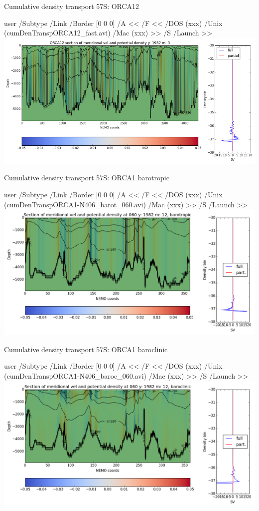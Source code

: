 \documentclass{beamer}
\newcommand{\LaunchBinary}[2]{%
  \leavevmode%
  \pdfstartlink user {
    /Subtype /Link
    /Border [0 0 0]%
    /A <<
      /F <<
         /DOS (xxx)
         /Unix (#1)
         /Mac (xxx)
      >>
      /S /Launch
    >>
  }#2%
  \pdfendlink%
}
\begin{document}
\begin{frame}{Cumulative density transport 57S: ORCA12}
\begin{center}
\LaunchBinary{cumDenTranspORCA12_fast.avi}{\includegraphics[width=1\textwidth]{cumDenTranspORCA12_t_000.png}}%
\end{center}
\end{frame}

\begin{frame}{Cumulative density transport 57S: ORCA1 barotropic}
\begin{center}
\LaunchBinary{cumDenTranspORCA1-N406_barot_060.avi}{\includegraphics[width=1\textwidth]{cumDenTranspORCA1-N406_barot_t_060_t_000.png}}%
\end{center}
\end{frame}

\begin{frame}{Cumulative density transport 57S: ORCA1 baroclinic}
\begin{center}
\LaunchBinary{cumDenTranspORCA1-N406_baroc_060.avi}{\includegraphics[width=1\textwidth]{cumDenTranspORCA1-N406_baroc_t_060_t_000.png}}%
\end{center}
\end{frame}
\end{document}

